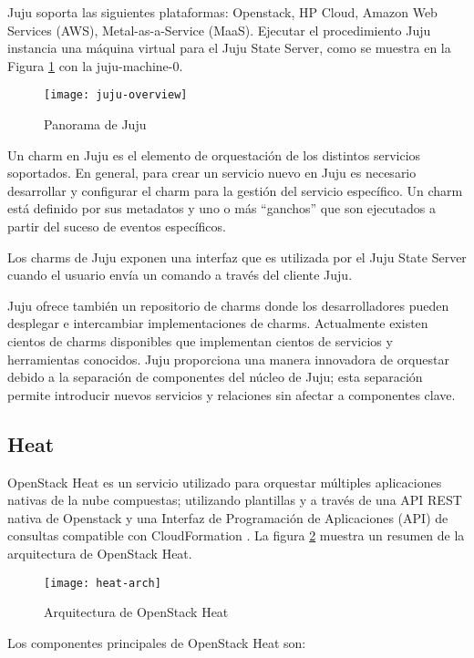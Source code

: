 Juju soporta las siguientes plataformas: Openstack, HP Cloud, Amazon Web Services (AWS), Metal-as-a-Service (MaaS). Ejecutar el procedimiento Juju instancia una máquina virtual  para el Juju State Server, como se muestra en la Figura \ref{fig:juju-overview} con la juju-machine-0.


\begin{figure}[H]
    \centering
    \texttt{[image: juju-overview]}
    \caption{ Panorama de Juju \protect\cite{Metsch2013-et}}
    \label{fig:juju-overview}
\end{figure}

Un charm en Juju es el elemento de orquestación de los distintos servicios soportados. En general, para crear un servicio nuevo en Juju es necesario desarrollar y configurar el charm para la gestión del servicio específico. Un charm está definido por sus metadatos y uno o más “ganchos” que son ejecutados a partir del suceso de eventos específicos. 

Los charms de Juju exponen una interfaz que es utilizada por el Juju State Server cuando el usuario envía un comando a través del cliente Juju. 

Juju ofrece también un repositorio de charms donde los desarrolladores pueden desplegar e intercambiar implementaciones de charms. Actualmente existen cientos de charms disponibles que implementan cientos de servicios y herramientas conocidos. Juju proporciona una manera innovadora de orquestar debido a la separación de componentes del núcleo de Juju; esta separación permite introducir nuevos servicios y relaciones sin afectar a componentes clave.


\subsection{Heat}

OpenStack Heat es un servicio utilizado para orquestar múltiples aplicaciones nativas de la nube compuestas; utilizando plantillas y a través de una API REST nativa de Openstack y una Interfaz de Programación de Aplicaciones (API) de consultas compatible con CloudFormation \cite{Rackspace2016-jh}. La figura \ref{fig:heat-arch} muestra un resumen de la arquitectura de OpenStack Heat.
\begin{figure}[h!]
    \centering
    \texttt{[image: heat-arch]}
    \caption{ Arquitectura de OpenStack Heat \protect\cite{Metsch2013-et}}
    \label{fig:heat-arch}
\end{figure}
Los componentes principales de OpenStack Heat son:

